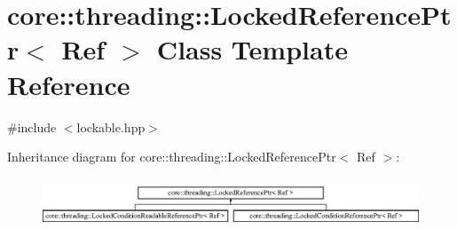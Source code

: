 \hypertarget{classcore_1_1threading_1_1_locked_reference_ptr}{\section{core\-:\-:threading\-:\-:Locked\-Reference\-Ptr$<$ Ref $>$ Class Template Reference}
\label{classcore_1_1threading_1_1_locked_reference_ptr}
}


{\ttfamily \#include $<$lockable.\-hpp$>$}

Inheritance diagram for core\-:\-:threading\-:\-:Locked\-Reference\-Ptr$<$ Ref $>$\-:\begin{figure}[H]
\begin{center}
\leavevmode
\includegraphics[height=1.489362cm]{classcore_1_1threading_1_1_locked_reference_ptr}
\end{center}
\end{figure}
